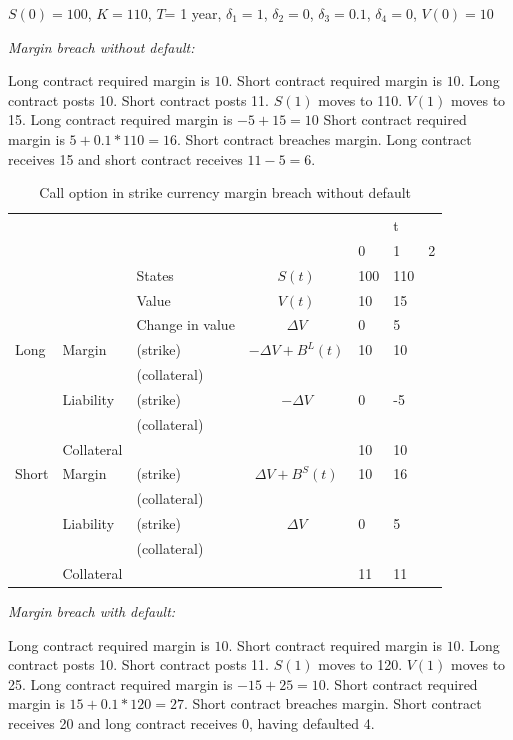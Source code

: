 \documentclass[12pt]{article}
\begin{document}
$S(0)=100$, $K=110$, $T$= 1 year, $\delta_1=1$, $\delta_2=0$, $\delta_3 =0.1$, $\delta_4=0$, $V(0)=10$


\textit{Margin breach without default:}

Long contract required margin is $10$. Short contract required margin is $10$. Long contract posts 10. Short contract posts 11. $S(1)$ moves to 110. $V(1)$ moves to 15. Long contract required margin is $-5 + 15=10$ Short contract required margin is $5 + 0.1*110 = 16$. Short contract breaches margin. Long contract receives 15 and short contract receives $11-5=6$.


\begin{table}
\begin{tabular}{lll|c|lll}
&  &  &  &  & t &\\  
&  &  &  & 0 & 1 & 2\\
\hline
\hline
&  & States &  $S(t)$ & 100 & 110 & \\
&  & Value  &  $V(t)$  & 10 & 15 &  \\
&  & Change in value & $\Delta V$ & 0& 5 &  \\
\hline
Long      & Margin    & (strike)     & $-\Delta V + B^L(t)$& 10 & 10 & \\
          &           & (collateral) & & & &\\ 
          & Liability & (strike)     & $-\Delta V$ & 0 & -5 & \\ 
          &           & (collateral)& & & &\\
          & Collateral&                       &    & 10 & 10 & \\
\hline          
Short     & Margin    & (strike)     & $\Delta V + B^S(t)$ & 10 & 16 & \\
          &           & (collateral) & & & &\\
          & Liability & (strike)     & $\Delta V$ & 0 & 5 &\\
          &           & (collateral) & & & &\\
          & Collateral&                       &    & 11 & 11 & \\ 
          

\end{tabular}
\caption{Call option in strike currency margin breach without default}
\label{fut}
\end{table}


\textit{Margin breach with default:}


Long contract required margin is $10$. Short contract required margin is $10$. Long contract posts 10. Short contract posts 11. $S(1)$ moves to 120. $V(1)$ moves to 25. Long contract required margin is $-15 + 25= 10$. Short contract required margin is $ 15+ 0.1*120 = 27$. Short contract breaches margin. Short contract receives 20 and long contract receives $0$, having defaulted 4.
\end{document}
